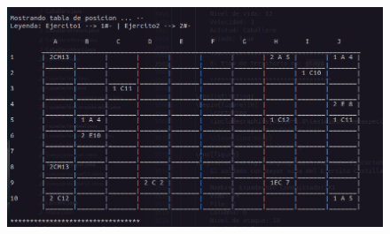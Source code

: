 \documentclass{article}
\begin{document}
	\begin{figure}[H]
		\centering
		\includegraphics[width=1.0\textwidth,keepaspectratio]{img/Commit11-3.png}
	\end{figure}
\end{document}
